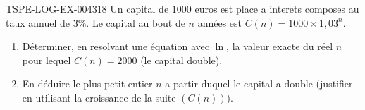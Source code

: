 \begin{exercice}{TSPE-LOG-EX-004}{3}{18}
Un capital de $1000$ euros est place a interets composes au taux annuel de $3\%$. Le capital au bout de $n$ années est $C(n) = 1000 \times 1{,}03^n$.
\begin{enumerate}
  \item Déterminer, en resolvant une équation avec $\ln$, la valeur exacte du réel $n$ pour lequel $C(n) = 2000$ (le capital double).
  \item En déduire le plus petit entier $n$ a partir duquel le capital a double (justifier en utilisant la croissance de la suite $(C(n))$).
\end{enumerate}
\end{exercice}
